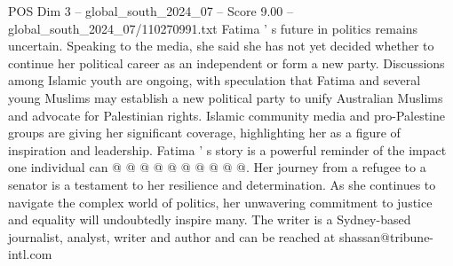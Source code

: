 \begin{textsample}{POS Dim 3 – global\_south\_2024\_07 – Score 9.00 – global\_south\_2024\_07/110270991.txt}
Fatima ' s future in politics remains uncertain.
Speaking to the media, she said she has not yet decided whether to continue her political career as an independent or form a new party.
Discussions among Islamic youth are ongoing, with speculation that Fatima and several young Muslims may establish a new political party to unify Australian Muslims and advocate for Palestinian rights.
Islamic community media and pro-Palestine groups are giving her significant coverage, highlighting her as a figure of inspiration and leadership.
Fatima ' s story is a powerful reminder of the impact one individual can @ @ @ @ @ @ @ @ @ @.
Her journey from a refugee to a senator is a testament to her resilience and determination.
As she continues to navigate the complex world of politics, her unwavering commitment to justice and equality will undoubtedly inspire many.
The writer is a Sydney-based journalist, analyst, writer and author and can be reached at shassan@tribune-intl.com

\end{textsample}
